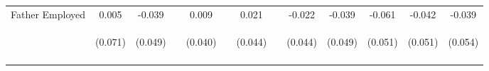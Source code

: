 \begin{tabular}{lcccccccccccc}
\noalign{\smallskip}Father Employed & 0.005 & -0.039 &  & 0.009 &  & 0.021 &  & -0.022 & -0.039 & -0.061 & -0.042 & -0.039\\
 & \begin{footnotesize}(0.071)\end{footnotesize} & \begin{footnotesize}(0.049)\end{footnotesize} & \begin{footnotesize}\end{footnotesize} & \begin{footnotesize}(0.040)\end{footnotesize} & \begin{footnotesize}\end{footnotesize} & \begin{footnotesize}(0.044)\end{footnotesize} & \begin{footnotesize}\end{footnotesize} & \begin{footnotesize}(0.044)\end{footnotesize} & \begin{footnotesize}(0.049)\end{footnotesize} & \begin{footnotesize}(0.051)\end{footnotesize} & \begin{footnotesize}(0.051)\end{footnotesize} & \begin{footnotesize}(0.054)\end{footnotesize}\\
\noalign{\smallskip}\hline\end{tabular}\\
